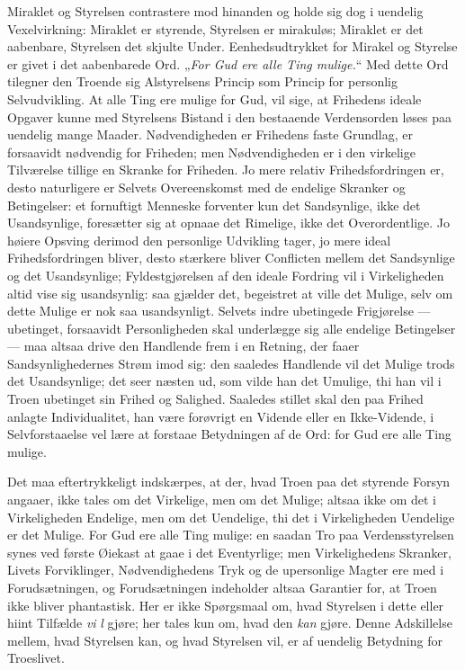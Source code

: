 \documentclass[12pt]{book}
\begin{document}
Miraklet og Styrelsen contrastere mod hinanden og holde sig dog i
uendelig Vexelvirkning: Miraklet er styrende, Styrelsen er
mirakuløs; Miraklet er det aabenbare, Styrelsen det skjulte Under.
Eenhedsudtrykket for Mirakel og Styrelse er givet i det aabenbarede
Ord. „\emph{For Gud ere alle Ting mulige.}“ Med dette Ord tilegner
den Troende sig Alstyrelsens Princip som Princip for personlig
Selvudvikling. At alle Ting ere mulige for Gud, vil sige, at
Frihedens ideale Opgaver kunne med Styrelsens Bistand i den
bestaaende Verdensorden løses paa uendelig mange Maader.
Nødvendigheden er Frihedens faste Grundlag, er forsaavidt nødvendig
for Friheden; men Nødvendigheden er i den virkelige Tilværelse
tillige en Skranke for Friheden. Jo mere relativ
Frihedsfordringen er, desto naturligere er Selvets Overeenskomst med
de endelige Skranker og Betingelser: et fornuftigt Menneske
forventer kun det Sandsynlige, ikke det Usandsynlige, foresætter sig
at opnaae det Rimelige, ikke det Overordentlige. Jo høiere Opsving
derimod den personlige Udvikling tager, jo mere ideal
Frihedsfordringen bliver, desto stærkere bliver Conflicten mellem
det Sandsynlige og det Usandsynlige; Fyldestgjørelsen af den ideale
Fordring vil i Virkeligheden altid vise sig usandsynlig: saa gjælder
det, begeistret at ville det Mulige, selv om dette Mulige er nok saa
usandsynligt. Selvets indre ubetingede Frigjørelse --- ubetinget,
forsaavidt Personligheden skal underlægge sig alle endelige
Betingelser --- maa altsaa drive den Handlende frem i en Retning,
der faaer Sandsynlighedernes Strøm imod sig: den saaledes Handlende
vil det Mulige trods det Usandsynlige; det seer næsten ud, som vilde
han det Umulige, thi han vil i Troen ubetinget sin Frihed og
Salighed. Saaledes stillet skal den paa Frihed anlagte
Individualitet, han være forøvrigt en Vidende eller en
Ikke-Vidende, i Selvforstaaelse vel lære at forstaae Betydningen af
de Ord: for Gud ere alle Ting mulige.

Det maa eftertrykkeligt indskærpes, at der, hvad Troen paa det
styrende Forsyn angaaer, ikke tales om det Virkelige, men om det
Mulige; altsaa ikke om det i Virkeligheden Endelige, men om det
Uendelige, thi det i Virkeligheden Uendelige er det Mulige. For Gud
ere alle Ting mulige: en saadan Tro paa Verdensstyrelsen synes ved
første Øiekast at gaae i det Eventyrlige; men Virkelighedens
Skranker, Livets Forviklinger, Nødvendighedens Tryk og de
upersonlige Magter ere med i Forudsætningen, og Forudsætningen
indeholder altsaa Garantier for, at Troen ikke bliver phantastisk.
Her er ikke Spørgsmaal om, hvad Styrelsen i dette eller hiint
Tilfælde \emph{vi}\-
\emph{l} gjøre; her tales kun om, hvad den \emph{kan} gjøre. Denne
Adskillelse mellem, hvad Styrelsen kan, og hvad Styrelsen vil, er af
uendelig Betydning for Troeslivet.
\end{document}
